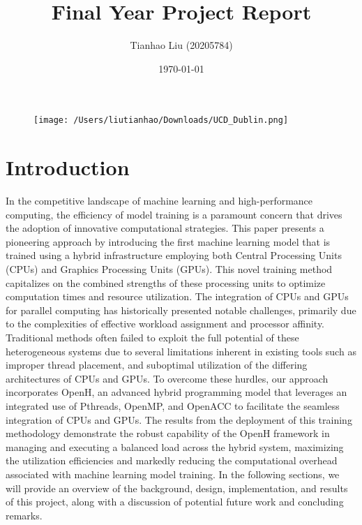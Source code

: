 \documentclass[11.5pt]{article}
\begin{document}

\title{Final Year Project Report}
\author{Tianhao Liu (20205784)}



\date{\today}
\maketitle

\begin{figure}[ht]
    \centering
    \texttt{[image: /Users/liutianhao/Downloads/UCD\_Dublin.png]}
\end{figure}


\newpage

\tableofcontents

\newpage

\listoffigures

\listoftables

\newpage


\section{Introduction}
In the competitive landscape of machine learning and high-performance computing, the efficiency of model training is a paramount concern that drives the adoption of innovative computational strategies. This paper presents a pioneering approach by introducing the first machine learning model that is trained using a hybrid infrastructure employing both Central Processing Units (CPUs) and Graphics Processing Units (GPUs). This novel training method capitalizes on the combined strengths of these processing units to optimize computation times and resource utilization.
The integration of CPUs and GPUs for parallel computing has historically presented notable challenges, primarily due to the complexities of effective workload assignment and processor affinity. Traditional methods often failed to exploit the full potential of these heterogeneous systems due to several limitations inherent in existing tools such as improper thread placement, and suboptimal utilization of the differing architectures of CPUs and GPUs.
To overcome these hurdles, our approach incorporates OpenH, an advanced hybrid programming model that leverages an integrated use of Pthreads, OpenMP, and OpenACC to facilitate the seamless integration of CPUs and GPUs\cite{paper1}. 
The results from the deployment of this training methodology demonstrate the robust capability of the OpenH framework in managing and executing a balanced load across the hybrid system, maximizing the utilization efficiencies and markedly reducing the computational overhead associated with machine learning model training.
In the following sections, we will provide an overview of the background, design, implementation, and results of this project, along with a discussion of potential future work and concluding remarks.
\end{document}
